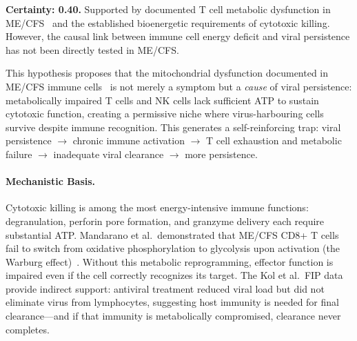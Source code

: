 \begin{hypothesis}
\label{hyp:immune-energy-starvation-niche}

\textbf{Certainty: 0.40.} Supported by documented T cell metabolic dysfunction in ME/CFS~\cite{Mandarano2020} and the established bioenergetic requirements of cytotoxic killing. However, the causal link between immune cell energy deficit and viral persistence has not been directly tested in ME/CFS.

This hypothesis proposes that the mitochondrial dysfunction documented in ME/CFS immune cells~\cite{Mandarano2020} is not merely a symptom but a \emph{cause} of viral persistence: metabolically impaired T cells and NK cells lack sufficient ATP to sustain cytotoxic function, creating a permissive niche where virus-harbouring cells survive despite immune recognition. This generates a self-reinforcing trap: viral persistence $\rightarrow$ chronic immune activation $\rightarrow$ T cell exhaustion and metabolic failure $\rightarrow$ inadequate viral clearance $\rightarrow$ more persistence.

\paragraph{Mechanistic Basis.}
Cytotoxic killing is among the most energy-intensive immune functions: degranulation, perforin pore formation, and granzyme delivery each require substantial ATP. Mandarano et al.\ demonstrated that ME/CFS CD8+ T cells fail to switch from oxidative phosphorylation to glycolysis upon activation (the Warburg effect)~\cite{Mandarano2020}. Without this metabolic reprogramming, effector function is impaired even if the cell correctly recognizes its target. The Kol et al.\ FIP data~\cite{Kol2026fipv} provide indirect support: antiviral treatment reduced viral load but did not eliminate virus from lymphocytes, suggesting host immunity is needed for final clearance---and if that immunity is metabolically compromised, clearance never completes.


\end{hypothesis}
